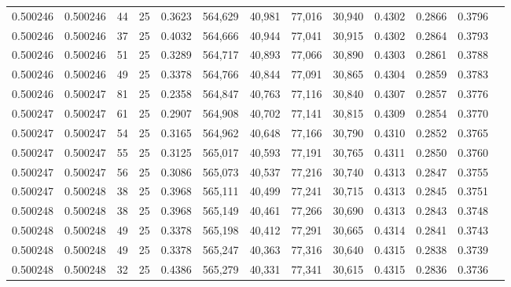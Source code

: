 \begin{tabular}{rrrrrrrrrrrrr}
0.500246 & 0.500246 &    44 &  25 &                                     0.3623 & 564,629 &  40,981 &  77,016 &  30,940 & 0.4302 & 0.2866 & 0.3796 \\
0.500246 & 0.500246 &    37 &  25 &                                     0.4032 & 564,666 &  40,944 &  77,041 &  30,915 & 0.4302 & 0.2864 & 0.3793 \\
0.500246 & 0.500246 &    51 &  25 &                                     0.3289 & 564,717 &  40,893 &  77,066 &  30,890 & 0.4303 & 0.2861 & 0.3788 \\
0.500246 & 0.500246 &    49 &  25 &                                     0.3378 & 564,766 &  40,844 &  77,091 &  30,865 & 0.4304 & 0.2859 & 0.3783 \\
0.500246 & 0.500247 &    81 &  25 &                                     0.2358 & 564,847 &  40,763 &  77,116 &  30,840 & 0.4307 & 0.2857 & 0.3776 \\
0.500247 & 0.500247 &    61 &  25 &                                     0.2907 & 564,908 &  40,702 &  77,141 &  30,815 & 0.4309 & 0.2854 & 0.3770 \\
0.500247 & 0.500247 &    54 &  25 &                                     0.3165 & 564,962 &  40,648 &  77,166 &  30,790 & 0.4310 & 0.2852 & 0.3765 \\
0.500247 & 0.500247 &    55 &  25 &                                     0.3125 & 565,017 &  40,593 &  77,191 &  30,765 & 0.4311 & 0.2850 & 0.3760 \\
0.500247 & 0.500247 &    56 &  25 &                                     0.3086 & 565,073 &  40,537 &  77,216 &  30,740 & 0.4313 & 0.2847 & 0.3755 \\
0.500247 & 0.500248 &    38 &  25 &                                     0.3968 & 565,111 &  40,499 &  77,241 &  30,715 & 0.4313 & 0.2845 & 0.3751 \\
0.500248 & 0.500248 &    38 &  25 &                                     0.3968 & 565,149 &  40,461 &  77,266 &  30,690 & 0.4313 & 0.2843 & 0.3748 \\
0.500248 & 0.500248 &    49 &  25 &                                     0.3378 & 565,198 &  40,412 &  77,291 &  30,665 & 0.4314 & 0.2841 & 0.3743 \\
0.500248 & 0.500248 &    49 &  25 &                                     0.3378 & 565,247 &  40,363 &  77,316 &  30,640 & 0.4315 & 0.2838 & 0.3739 \\
0.500248 & 0.500248 &    32 &  25 &                                     0.4386 & 565,279 &  40,331 &  77,341 &  30,615 & 0.4315 & 0.2836 & 0.3736 \\

\end{tabular}
